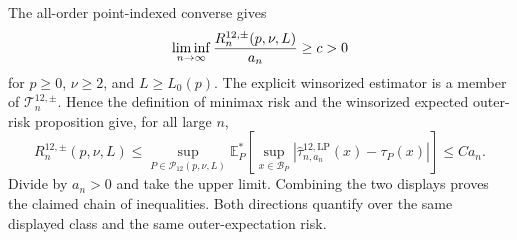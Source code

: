 The all-order point-indexed converse gives
\[
 \liminf_{n\to\infty}{R_n^{12,\pm}(p,\nu,L)\over a_n}\geq c>0
\]
for \(p\geq0\), \(\nu\geq2\), and \(L\geq L_0(p)\).  The explicit winsorized estimator is a member of \(\mathcal T_n^{12,\pm}\).  Hence the definition of minimax risk and the winsorized expected outer-risk proposition give, for all large \(n\),
\[
 R_n^{12,\pm}(p,\nu,L)
 \leq \sup_{P\in\mathcal P_{12}(p,\nu,L)}
 \mathbb E_P^*\!\left[
 \sup_{x\in\mathcal B_P}
 |\widehat\tau^{12,\mathrm{LP}}_{n,a_n}(x)-\tau_P(x)|
 \right]
 \leq Ca_n.
\]
Divide by \(a_n>0\) and take the upper limit.  Combining the two displays proves the claimed chain of inequalities.  Both directions quantify over the same displayed class and the same outer-expectation risk.